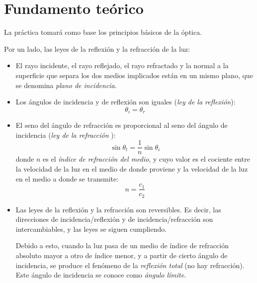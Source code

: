 \documentclass[a4paper,twocolumn]{article}
\begin{document}
 
	\section{Fundamento teórico} \label{cap:FunTeo}

        
        La práctica tomará como base los principios básicos de la óptica.
        
        Por un lado, las leyes de la reflexión y la refracción de la luz:
        
        \begin{itemize}
        
            \item El rayo incidente, el rayo reflejado, el rayo refractado y la normal a la superficie que separa los dos medios implicados están en un mismo plano, que se denomina \textit{plano de incidencia}.
            
            \item Los ángulos de incidencia y de reflexión son iguales (\textit{ley de la reflexión}):     
                \begin{equation}
                    \theta_i = \theta_r
                \end{equation}
                
            \item El seno del ángulo de refracción es proporcional al seno del ángulo de incidencia (\textit{ley de la refracción} \cite{huygens1703dioptrica}):            
                \begin{equation}
                    \sin \theta_t = \frac{1}{n} \sin \theta_i
                \end{equation}            
            donde $n$ es el \textit{índice de refracción del medio}, y cuyo valor es el cociente entre la velocidad de la luz en el medio de donde proviene y la velocidad de la luz en el medio a donde se transmite:            
                \begin{equation*}
                    n = \frac{c_1}{c_2}
                \end{equation*}
            
            \item Las leyes de la reflexión y la refracción son reversibles. Es decir, las direcciones de incidencia/reflexión y de incidencia/refracción son intercambiables, y las leyes se siguen cumpliendo.
            
            Debido a esto, cuando la luz pasa de un medio de índice de refracción absoluto mayor a otro de índice menor, y a partir de cierto ángulo de incidencia, se produce el fenómeno de la \textit{reflexión total} (no hay refracción). Este ángulo de incidencia se conoce como \textit{ángulo límite}. 
            
        \end{itemize}
\end{document}
